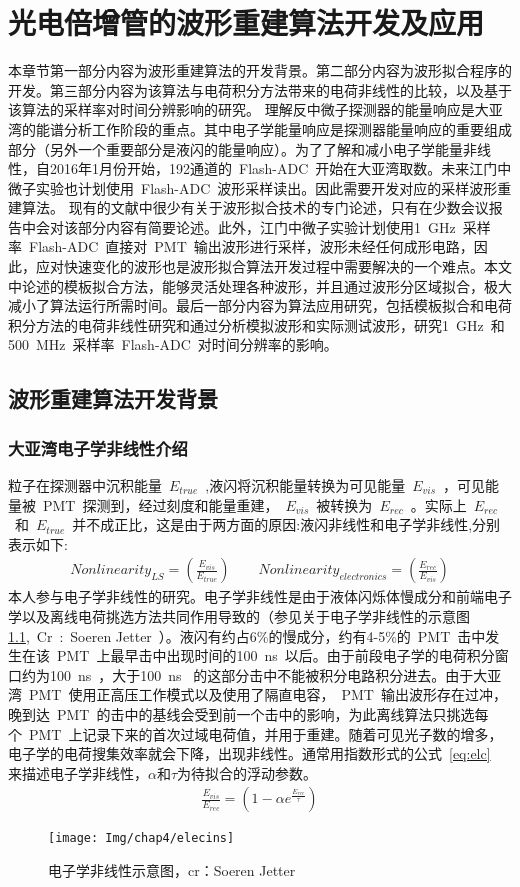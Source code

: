 
\chapter{光电倍增管的波形重建算法开发及应用}
\label{chap:chap4}
本章节第一部分内容为波形重建算法的开发背景。第二部分内容为波形拟合程序的开发。第三部分内容为该算法与电荷积分方法带来的电荷非线性的比较，以及基于该算法的采样率对时间分辨影响的研究。
理解反中微子探测器的能量响应是大亚湾的能谱分析工作阶段的重点。其中电子学能量响应是探测器能量响应的重要组成部分（另外一个重要部分是液闪的能量响应）。为了了解和减小电子学能量非线性，自2016年1月份开始，192通道的~Flash-ADC~开始在大亚湾取数。未来江门中微子实验也计划使用~Flash-ADC~波形采样读出。因此需要开发对应的采样波形重建算法。
现有的文献中很少有关于波形拟合技术的专门论述，只有在少数会议报告中会对该部分内容有简要论述。此外，江门中微子实验计划使用1~GHz~采样率~Flash-ADC~直接对~PMT~输出波形进行采样，波形未经任何成形电路，因此，应对快速变化的波形也是波形拟合算法开发过程中需要解决的一个难点。本文中论述的模板拟合方法，能够灵活处理各种波形，并且通过波形分区域拟合，极大减小了算法运行所需时间。最后一部分内容为算法应用研究，包括模板拟合和电荷积分方法的电荷非线性研究和通过分析模拟波形和实际测试波形，研究1~GHz~和500~MHz~采样率~Flash-ADC~对时间分辨率的影响。
\section{波形重建算法开发背景}
\subsection{大亚湾电子学非线性介绍}
粒子在探测器中沉积能量~$E_{true}$~,液闪将沉积能量转换为可见能量~$E_{vis}$~，可见能量被~PMT~探测到，经过刻度和能量重建，~$E_{vis}$~被转换为~$E_{rec}$~。实际上~$E_{rec}$~和~$E_{true}$~并不成正比，这是由于两方面的原因:液闪非线性和电子学非线性,分别表示如下:
\begin{eqnarray}
\label{eq:def}
Nonlinearity_{  LS}=\left( \frac{E_{vis}}{E_{true}} \right) \quad\quad
Nonlinearity_{  electronics}=\left( \frac{E_{rec}}{E_{vis}} \right)
\end{eqnarray}
本人参与电子学非线性的研究。电子学非线性是由于液体闪烁体慢成分和前端电子学以及离线电荷挑选方法共同作用导致的（参见关于电子学非线性的示意图\ref{fig:lscomp},~Cr~:~Soeren Jetter~）。液闪有约占6\%的慢成分，约有4-5\%的~PMT~击中发生在该~PMT~上最早击中出现时间的100~ns~以后。由于前段电子学的电荷积分窗口约为100~ns~，大于100~ns~ 的这部分击中不能被积分电路积分进去。由于大亚湾~PMT~使用正高压工作模式以及使用了隔直电容，~PMT~输出波形存在过冲，晚到达~PMT~的击中的基线会受到前一个击中的影响，为此离线算法只挑选每个~PMT~上记录下来的首次过域电荷值，并用于重建。随着可见光子数的增多，电子学的电荷搜集效率就会下降，出现非线性。通常用指数形式的公式~\ref{eq:elc}~ 来描述电子学非线性，$\alpha$和$\tau$为待拟合的浮动参数。
\begin{eqnarray}
\label{eq:elc}
\frac{E_{vis}}{E_{rec}}=(1-\alpha e^{\frac{E_{rec}}{\tau}})
\end{eqnarray}
\begin{figure}[!htbp]
  \centering
   \texttt{[image: Img/chap4/elecins]}
    \caption{电子学非线性示意图，cr：Soeren Jetter}
  \label{fig:lscomp}
\end{figure}
